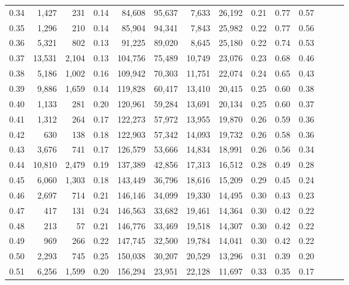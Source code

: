 \begin{tabular}{rrrrrrrrrrrrrr}
0.34 &   1,427 &    231 &  0.14 &   84,608 &   95,637 &   7,633 &  26,192 &  0.21 &  0.77 &      0.57 \\
0.35 &   1,296 &    210 &  0.14 &   85,904 &   94,341 &   7,843 &  25,982 &  0.22 &  0.77 &      0.56 \\
0.36 &   5,321 &    802 &  0.13 &   91,225 &   89,020 &   8,645 &  25,180 &  0.22 &  0.74 &      0.53 \\
0.37 &  13,531 &  2,104 &  0.13 &  104,756 &   75,489 &  10,749 &  23,076 &  0.23 &  0.68 &      0.46 \\
0.38 &   5,186 &  1,002 &  0.16 &  109,942 &   70,303 &  11,751 &  22,074 &  0.24 &  0.65 &      0.43 \\
0.39 &   9,886 &  1,659 &  0.14 &  119,828 &   60,417 &  13,410 &  20,415 &  0.25 &  0.60 &      0.38 \\
0.40 &   1,133 &    281 &  0.20 &  120,961 &   59,284 &  13,691 &  20,134 &  0.25 &  0.60 &      0.37 \\
0.41 &   1,312 &    264 &  0.17 &  122,273 &   57,972 &  13,955 &  19,870 &  0.26 &  0.59 &      0.36 \\
0.42 &     630 &    138 &  0.18 &  122,903 &   57,342 &  14,093 &  19,732 &  0.26 &  0.58 &      0.36 \\
0.43 &   3,676 &    741 &  0.17 &  126,579 &   53,666 &  14,834 &  18,991 &  0.26 &  0.56 &      0.34 \\
0.44 &  10,810 &  2,479 &  0.19 &  137,389 &   42,856 &  17,313 &  16,512 &  0.28 &  0.49 &      0.28 \\
0.45 &   6,060 &  1,303 &  0.18 &  143,449 &   36,796 &  18,616 &  15,209 &  0.29 &  0.45 &      0.24 \\
0.46 &   2,697 &    714 &  0.21 &  146,146 &   34,099 &  19,330 &  14,495 &  0.30 &  0.43 &      0.23 \\
0.47 &     417 &    131 &  0.24 &  146,563 &   33,682 &  19,461 &  14,364 &  0.30 &  0.42 &      0.22 \\
0.48 &     213 &     57 &  0.21 &  146,776 &   33,469 &  19,518 &  14,307 &  0.30 &  0.42 &      0.22 \\
0.49 &     969 &    266 &  0.22 &  147,745 &   32,500 &  19,784 &  14,041 &  0.30 &  0.42 &      0.22 \\
0.50 &   2,293 &    745 &  0.25 &  150,038 &   30,207 &  20,529 &  13,296 &  0.31 &  0.39 &      0.20 \\
0.51 &   6,256 &  1,599 &  0.20 &  156,294 &   23,951 &  22,128 &  11,697 &  0.33 &  0.35 &      0.17 \\

\end{tabular}

